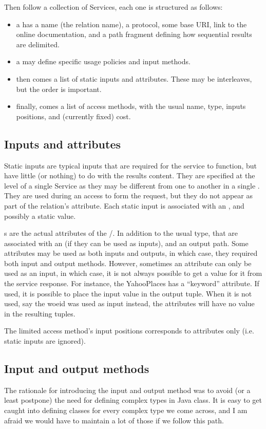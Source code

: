 Then follow a collection of Services, each one is structured as
follows:
\begin{itemize}
    \item a  has a name (the relation name), a protocol, some
      base URI, link to the online documentation, and a path fragment
      defining how sequential results are delimited.
    \item a  may define specific usage policies and input
      methods.
    \item then comes a list of static inputs and attributes. These may
      be interleaves, but the order is important.
    \item finally, comes a list of access methods, with the usual
      name, type, inputs positions, and (currently fixed) cost.
\end{itemize}

\subsection{Inputs and attributes}
Static inputs are typical inputs that are required for the service to
function, but have little (or nothing) to do with the results content.
They are specified at the level of a single Service as they may be
different from one  to another in a single .
They are used during an access to form the request, but they do not
appear as part of the relation's attribute.
Each static input is associated with an , and possibly a
static value.

s are the actual attributes of the /.
In addition to the usual type, that are associated with an
 (if they can be used as inputs), and an output path.
Some attributes may be used as both inputs and outputs, in which case,
they required both input and output methods.
However, sometimes an attribute can only be used as an input, in which
case, it is not always possible to get a value for it from the service
response.
For instance, the YahooPlaces has a ``keyword'' attribute. If used, it
is possible to place the input value in the output tuple.
When it is not used, say the woeid was used as input instead, the
attributes will have no value in the resulting tuples.

The limited access method's input positions corresponds to attributes
only (i.e. static inputs are ignored).

\subsection{Input and output methods}
The rationale for introducing the input and output method was to avoid
(or a least postpone) the need for defining complex types in Java
class.
It is easy to get caught into defining classes for every complex type
we come across, and I am afraid we would have to maintain a lot of
those if we follow this path.

